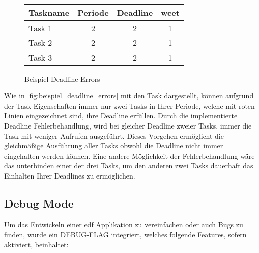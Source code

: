 \documentclass[../EDF Master Thesis.tex]{subfiles}
\begin{document}
\begin{figure}[H]
\begin{tikzpicture}
        \end{tikzpicture}\\
        \vspace {1cm}
        \begin{tabular}{l|c|c|c}
            Taskname & Periode & Deadline & \ac{wcet} \\
            \hline
            Task 1 & 2 & 2 & 1 \\
            Task 2 & 2 & 2 & 1 \\
            Task 3 & 2 & 2 & 1 
        \end{tabular}
        \caption{Beispiel Deadline Errors}
        \label{fig:beispiel_deadline_errors}
    \end{figure}

    Wie in \autoref{fig:beispiel_deadline_errors} mit den Task dargestellt, können aufgrund der Task Eigenschaften immer nur zwei Tasks in Ihrer Periode, welche mit roten Linien eingezeichnet sind, ihre Deadline erfüllen.
    Durch die implementierte Deadline Fehlerbehandlung, wird bei gleicher Deadline zweier Tasks, immer die Task mit weniger Aufrufen ausgeführt.
    Dieses Vorgehen ermöglicht die gleichmäßige Ausführung aller Tasks obwohl die Deadline nicht immer eingehalten werden können.
    Eine andere Möglichkeit der Fehlerbehandlung wäre das unterbinden einer der drei Tasks, um den anderen zwei Tasks dauerhaft das Einhalten Ihrer Deadlines zu ermöglichen.

\subsection{Debug Mode} \label{section:debug_mode}

    Um das Entwickeln einer \ac{edf} Applikation zu vereinfachen oder auch Bugs zu finden, wurde ein DEBUG-FLAG integriert, welches folgende Features, sofern aktiviert, beinhaltet:
\end{document}
